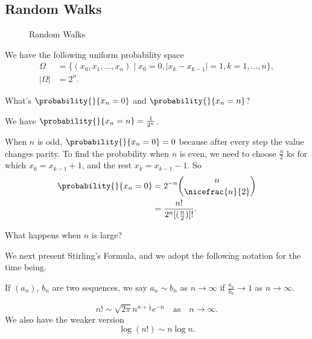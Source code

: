 \subsection{Random Walks}
\begin{figure}[htpb]
    \begin{subfigure}{0.48\textwidth}
    \centering
    \end{subfigure}
    \begin{subfigure}{0.48\textwidth}
    \centering
    \end{subfigure}
    \caption{Random Walks}
    \label{fig:}
\end{figure}
We have the following uniform probability space
\begin{align*}
    \Omega &= \{(x_0, x_1, \ldots ,x_n) \mid x_0 = 0, \left\vert x_k - x_{k-1} \right\vert = 1, k = 1, \ldots, n\},\\
    \left\vert \Omega \right\vert &= 2^n.
\end{align*}
\begin{problem}
    What's \(\probability{}{x_n = 0}\) and \(\probability{}{x_n = n} \)?
\end{problem}
We have \(\probability{}{x_n = n} = \frac{1}{2^n}\).

When \(n\) is odd, \(\probability{}{x_n = 0} = 0\) because after every step the value changes parity. To find the probability when \(n\) is even, we need to choose \(\frac{n}{2}\) ks for which \(x_k = x_{k-1} + 1\), and the rest \(x_k = x_{k-1}-1\). So
\begin{align*}
    \probability{}{x_n=0} &= 2^{-n}\binom{n}{\nicefrac{n}{2}}\\
    &= \frac{n!}{2^n[(\frac{n}{2})]!}.
\end{align*}
\begin{problem}
    What happens when \(n\) is large?
\end{problem}
We next present Stirling's Formula, and we adopt the following notation for the time being.
\begin{notation}
    If \((a_n)\), \(b_n\) are two sequences, we say \(a_{n} \sim b_n \) as \(n \to \infty\) if \(\frac{a_n}{b_n}\to 1\) as \(n \to \infty\).
\end{notation}
\begin{theorem}
    \leavevmode
    \[
        n! \sim \sqrt{2\pi} n^{n+\frac{1}{2}}e^{-n} \quad \text{as}\quad n \to \infty.
    \]
    We also have the weaker version
    \[
        \log(n!)\sim n\log n.
    \]
\end{theorem}